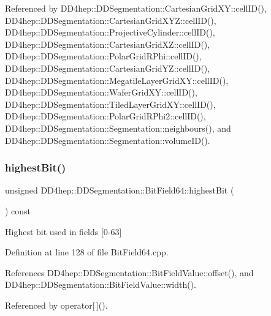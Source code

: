Referenced by D\+D4hep\+::\+D\+D\+Segmentation\+::\+Cartesian\+Grid\+X\+Y\+::cell\+I\+D(), D\+D4hep\+::\+D\+D\+Segmentation\+::\+Cartesian\+Grid\+X\+Y\+Z\+::cell\+I\+D(), D\+D4hep\+::\+D\+D\+Segmentation\+::\+Projective\+Cylinder\+::cell\+I\+D(), D\+D4hep\+::\+D\+D\+Segmentation\+::\+Cartesian\+Grid\+X\+Z\+::cell\+I\+D(), D\+D4hep\+::\+D\+D\+Segmentation\+::\+Polar\+Grid\+R\+Phi\+::cell\+I\+D(), D\+D4hep\+::\+D\+D\+Segmentation\+::\+Cartesian\+Grid\+Y\+Z\+::cell\+I\+D(), D\+D4hep\+::\+D\+D\+Segmentation\+::\+Megatile\+Layer\+Grid\+X\+Y\+::cell\+I\+D(), D\+D4hep\+::\+D\+D\+Segmentation\+::\+Wafer\+Grid\+X\+Y\+::cell\+I\+D(), D\+D4hep\+::\+D\+D\+Segmentation\+::\+Tiled\+Layer\+Grid\+X\+Y\+::cell\+I\+D(), D\+D4hep\+::\+D\+D\+Segmentation\+::\+Polar\+Grid\+R\+Phi2\+::cell\+I\+D(), D\+D4hep\+::\+D\+D\+Segmentation\+::\+Segmentation\+::neighbours(), and D\+D4hep\+::\+D\+D\+Segmentation\+::\+Segmentation\+::volume\+I\+D().

\hypertarget{class_d_d4hep_1_1_d_d_segmentation_1_1_bit_field64_ade7261b7a693ef039eb108ae218206f2}{}\label{class_d_d4hep_1_1_d_d_segmentation_1_1_bit_field64_ade7261b7a693ef039eb108ae218206f2} 
\subsubsection{\texorpdfstring{highest\+Bit()}{highestBit()}}
{\footnotesize\ttfamily unsigned D\+D4hep\+::\+D\+D\+Segmentation\+::\+Bit\+Field64\+::highest\+Bit (\begin{DoxyParamCaption}{ }\end{DoxyParamCaption}) const}

Highest bit used in fields \mbox{[}0-\/63\mbox{]} 

Definition at line 128 of file Bit\+Field64.\+cpp.



References D\+D4hep\+::\+D\+D\+Segmentation\+::\+Bit\+Field\+Value\+::offset(), and D\+D4hep\+::\+D\+D\+Segmentation\+::\+Bit\+Field\+Value\+::width().



Referenced by operator\mbox{[}$\,$\mbox{]}().

\hypertarget{class_d_d4hep_1_1_d_d_segmentation_1_1_bit_field64_ad3aaec5213c6d723eb60aec78e957823}{}\label{class_d_d4hep_1_1_d_d_segmentation_1_1_bit_field64_ad3aaec5213c6d723eb60aec78e957823} 
